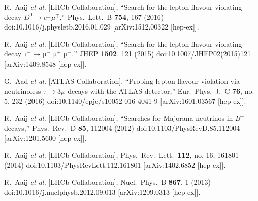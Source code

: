 \documentclass{PoS}
\begin{document}
\begin{thebibliography}{99}
  R.~Aaij {\it et al.} [LHCb Collaboration],
  ``Search for the lepton-flavour violating decay $D^0 \to e^\pm\mu^\mp$,''
  Phys.\ Lett.\ B {\bf 754}, 167 (2016)
  doi:10.1016/j.physletb.2016.01.029
  [arXiv:1512.00322 [hep-ex]].

  R.~Aaij {\it et al.} [LHCb Collaboration],
  ``Search for the lepton flavour violating decay τ$^{−}$ → μ$^{−}$ μ$^{+}$ μ$^{−}$,''
  JHEP {\bf 1502}, 121 (2015)
  doi:10.1007/JHEP02(2015)121
  [arXiv:1409.8548 [hep-ex]].


  G.~Aad {\it et al.} [ATLAS Collaboration],
  ``Probing lepton flavour violation via neutrinoless $\tau \longrightarrow 3\mu$ decays with the ATLAS detector,''
  Eur.\ Phys.\ J.\ C {\bf 76}, no. 5, 232 (2016)
  doi:10.1140/epjc/s10052-016-4041-9
  [arXiv:1601.03567 [hep-ex]].

  R.~Aaij {\it et al.} [LHCb Collaboration],
  ``Searches for Majorana neutrinos in $B^-$ decays,''
  Phys.\ Rev.\ D {\bf 85}, 112004 (2012)
  doi:10.1103/PhysRevD.85.112004
  [arXiv:1201.5600 [hep-ex]].

  R.~Aaij {\it et al.} [LHCb Collaboration],
  Phys.\ Rev.\ Lett.\  {\bf 112}, no. 16, 161801 (2014)
  doi:10.1103/PhysRevLett.112.161801
  [arXiv:1402.6852 [hep-ex]].

  R.~Aaij {\it et al.} [LHCb Collaboration],
  Nucl.\ Phys.\ B {\bf 867}, 1 (2013)
  doi:10.1016/j.nuclphysb.2012.09.013
  [arXiv:1209.0313 [hep-ex]].


\end{thebibliography}
\end{document}
